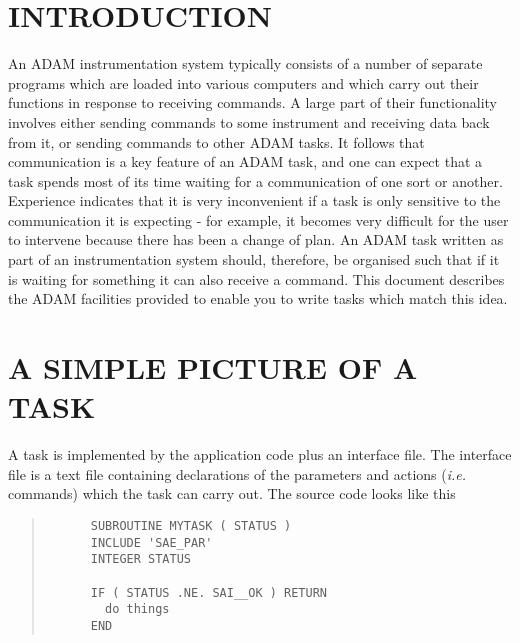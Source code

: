 \markright{\stardocname}
\newpage
\markright{\stardocname}



\small
  \setlength{\parskip}{0mm}
  \tableofcontents
  \setlength{\parskip}{\medskipamount}
  \markright{\stardocname}
\normalsize

\section{INTRODUCTION}

An ADAM instrumentation system typically consists of a number of 
separate programs which are loaded into various computers and which 
carry out their functions in response to receiving commands. A large part 
of their functionality involves either sending commands to some 
instrument and receiving data back from it, or sending commands to other 
ADAM tasks. It follows that communication is a key feature of an ADAM 
task, and one can expect that a task spends most of its time waiting for 
a communication of one sort or another. Experience indicates that it is 
very inconvenient if a task is only sensitive to the communication it is 
expecting - for example, it becomes very difficult for the user to
intervene because there has been a change of plan. An ADAM task written
as part of an instrumentation system should, therefore, be organised
such that if it is waiting for something it can also receive a command.
This document describes the ADAM facilities provided to enable you to
write tasks which match this idea. 


\section{A SIMPLE PICTURE OF A TASK}

A task is implemented by the application code plus an interface file. 
The interface file is a text file containing declarations of the 
parameters and actions ({\em i.e.} commands) which the task can carry out. The 
source code looks like this
\small \begin{quote} \begin{verbatim}
      SUBROUTINE MYTASK ( STATUS )
      INCLUDE 'SAE_PAR'
      INTEGER STATUS

      IF ( STATUS .NE. SAI__OK ) RETURN
        do things
      END
\end{verbatim} \end{quote} \normalsize


